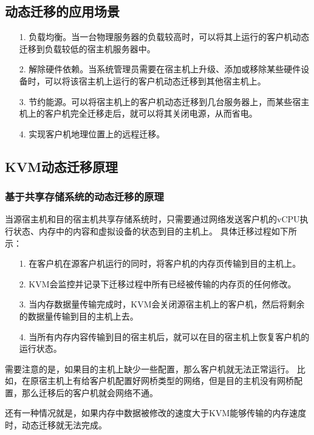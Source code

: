 \documentclass[a4paper,left=2.5cm,right=2.5cm,11pt]{article}
\begin{document}
\subsection{动态迁移的应用场景}
	\begin{itemize}
		\item[1.] 负载均衡。当一台物理服务器的负载较高时，可以将其上运行的客户机动态迁移到负载较低的宿主机服务器中。
		\item[2.] 解除硬件依赖。当系统管理员需要在宿主机上升级、添加或移除某些硬件设备时，可以将该宿主机上运行的客户机动态迁移到其他宿主机上。
		\item[3.] 节约能源。可以将宿主机上的客户机动态迁移到几台服务器上，而某些宿主机上的客户机完全迁移走后，就可以将其关闭电源，从而省电。
		\item[4.] 实现客户机地理位置上的远程迁移。
	\end{itemize}

\subsection{KVM动态迁移原理}
\subsubsection{基于共享存储系统的动态迁移的原理}
	当源宿主机和目的宿主机共享存储系统时，只需要通过网络发送客户机的vCPU执行状态、内存中的内容和虚拟设备的状态到目的主机上。
	具体迁移过程如下所示：
	\begin{itemize}
		\item[1.] 在客户机在源客户机运行的同时，将客户机的内存页传输到目的主机上。
		\item[2.] KVM会监控并记录下迁移过程中所有已经被传输的内存页的任何修改。
		\item[3.] 当内存数据量传输完成时，KVM会关闭源宿主机上的客户机，然后将剩余的数据量传输到目的主机上去。
		\item[4.] 当所有内存内容传输到目的宿主机后，就可以在目的宿主机上恢复客户机的运行状态。
	\end{itemize}

	需要注意的是，如果目的主机上缺少一些配置，那么客户机就无法正常运行。
	比如，在原宿主机上有给客户机配置好网桥类型的网络，但是目的主机没有网桥配置，那么迁移后的客户机就会网络不通。\par
	还有一种情况就是，如果内存中数据被修改的速度大于KVM能够传输的内存速度时，动态迁移就无法完成。
\end{document}
